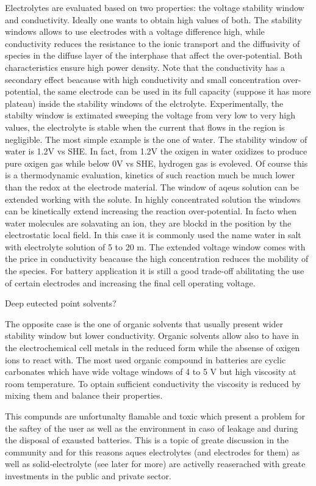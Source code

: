 Electrolytes are evaluated based on two properties: the voltage stability window and conductivity. Ideally one wants to obtain high values of both. The stability windows allows to use electrodes with a voltage difference high, while conductivity reduces the resistance to the ionic transport and the diffusivity of species in the diffuse layer of the interphase that affect the over-potential. Both characteristics ensure high power density. Note that the conductivity has a secondary effect beacause with high conductivity and small concentration over-potential, the same electrode can be used in its full capacity (suppose it has more plateau) inside the stability windows of the elctrolyte. Experimentally, the stabilty window is extimated sweeping the voltage from very low to very high values, the electrolyte is stable when the current that flows in the region is negligible. The most simple example is the one of water. The stability window of water is 1.2V vs SHE. In fact, from 1.2V the oxigen in water oxidizes to produce pure oxigen gas while below 0V vs SHE, hydrogen gas is evoleved. Of course this is a thermodynamic evaluation, kinetics of such reaction much be much lower than the redox at the electrode material. The window of aqeus solution can be extended working with the solute. In highly concentrated solution the windows can be kinetically extend increasing the reaction over-potential. In facto when water molecules are solavating an ion, they are blockd in the position by the electrostatic local field. In this case it is commonly used the name water in salt with electrolyte solution of 5 to 20 m. The extended voltage window comes with the price in conductivity beacause the high concentration reduces the mobility of the species. For battery application it is still a good trade-off abilitating the use of certain electrodes and increasing the final cell operating voltage.

Deep eutected point solvents?

The opposite case is the one of organic solvents that usually present wider stability window but lower conductivity. Organic solvents allow also to have in the electrochemical cell metals in the reduced form while the absense of oxigen ions to react with. 
The most used organic compound in batteries are cyclic carbonates which have wide voltage windows of 4 to 5 V but high viscosity at room temperature. To optain sufficient conductivity the viscosity is reduced by mixing them and balance their properties.

This compunds are unfortunalty flamable and toxic which present a problem for the saftey of the user as well as the environment in caso of leakage and during the disposal of exausted batteries. This is a topic of greate discussion in the community and for this reasons aques electrolytes (and electrodes for them) as well as solid-electrolyte (see later for more) are activelly reaserached with greate investments in the public and private sector.

